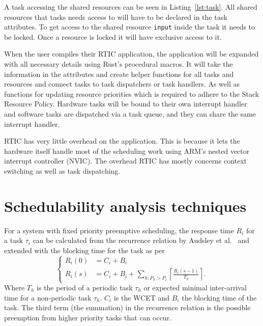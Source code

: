 A task accessing the shared resources can be seen in Listing~\ref{lst:task}.
All shared resources that tasks needs access to will have to be declared in the
task attributes. To get access to the shared resource \texttt{input} inside the
task it needs to be locked. Once a resource is locked it will have exclusive
access to it.


When the user compiles their RTIC application, the application will be expanded
with all necessary details using Rust's procedural macros. It will take the
information in the attributes and create helper functions for all tasks and
resources and connect tasks to task dispatchers or task handlers. As well as
functions for updating resource priorities which is required to adhere to the
Stack Resource Policy. Hardware tasks will be bound to their own interrupt handler
and software tasks are dispatched via a task queue, and they can share the same
interrupt handler.

RTIC has very little overhead on the application. This is because it lets the
hardware itself handle most of the scheduling work using ARM's nested vector
interrupt controller (NVIC). The overhead RTIC has mostly concerns context switching
as well as task dispatching.

\section{Schedulability analysis techniques}\label{theory:schedulability}
For a system with fixed priority preemptive scheduling, the response time $R_i$
for a task $\tau_i$ can be calculated from the recurrence relation by Audsley
et al.\ \cite{audsley93} and extended with the blocking time for the task as
per\cite{hardrealtimecomputingsystems}
\begin{equation}
    \begin{cases}
        R_{i}(0) &= C_i + B_i \\
        R_{i}(s) &= C_i + B_i + \sum\limits_{h: P_h > P_i} \left\lceil \frac{R_{i}(s-1)}{T_h} \right\rceil.
    \end{cases}
\end{equation}
Where $T_h$ is the period of a periodic task $\tau_h$ or expected minimal
inter-arrival time for a non-periodic task $\tau_h$. $C_i$ is the WCET and
$B_i$ the blocking time of the task. The third term (the summation) in the
recurrence relation is the possible preemption from higher priority tasks that
can occur.

